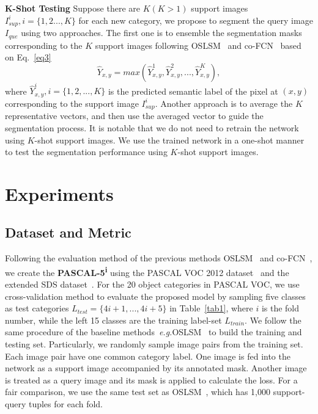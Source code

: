 \documentclass[journal]{IEEEtran}
\newcommand{\eg}{\emph{e.g.}}
\begin{document}
\noindent \textbf{K-Shot Testing}
Suppose there are $K (K>1)$  support images $I^i_{sup}, i=\{1,2...,K\}$ for each new category, we propose to segment the query image $I_{que}$ using two approaches.
The first one is to ensemble the segmentation masks corresponding to the $K$ support images following OSLSM~\cite{shaban2017one} and co-FCN~\cite{rakelly2018conditional} based on Eq.~\eqref{eq3}
\begin{equation}\label{eq3}
\hat{Y}_{x,y} =  max(\hat{Y}_{x,y}^{1}, \hat{Y}_{x,y}^{2},...,\hat{Y}_{x,y}^{K}),
\end{equation}
where $\hat{Y}^{i}_{x,y}, i=\{1,2,...,K\}$ is the predicted semantic label of the pixel at $(x,y)$ corresponding to the support image $I^i_{sup}$.
Another approach is to average the $K$ representative vectors, and then use the averaged vector to guide the segmentation process.
It is notable that we do not need to retrain the network using $K$-shot support images.
We use the trained network in a one-shot manner to test the segmentation performance using $K$-shot support images.




\section{Experiments}
\subsection{Dataset and Metric}
Following the evaluation method of the previous methods OSLSM~\cite{shaban2017one} and co-FCN~\cite{rakelly2018conditional}, we create the \textbf{PASCAL-5\textsuperscript{i}} using the PASCAL VOC 2012 dataset~\cite{2010-pascal} and the extended SDS dataset~\cite{hariharan2011semantic}. 
For the 20 object categories in PASCAL VOC, we use cross-validation method to evaluate the proposed model by sampling five classes as test categories $L_{test}=\{4i+1,...,4i+5\}$ in Table~\ref{tab1}, where $i$ is the fold number, while the left 15 classes are the training label-set $L_{train}$.
We follow the same procedure of the baseline methods~\eg OSLSM~\cite{shaban2017one} to build the training and testing set. 
Particularly, we randomly sample image pairs from the training set.
Each image pair have one common category label.
One image is fed into the network as a support image accompanied by its annotated mask.
Another image is treated as a query image and its mask is applied to calculate the loss.
For a fair comparison, we use the same test set as OSLSM~\cite{shaban2017one}, which has 1,000 support-query tuples for each fold.
\end{document}
